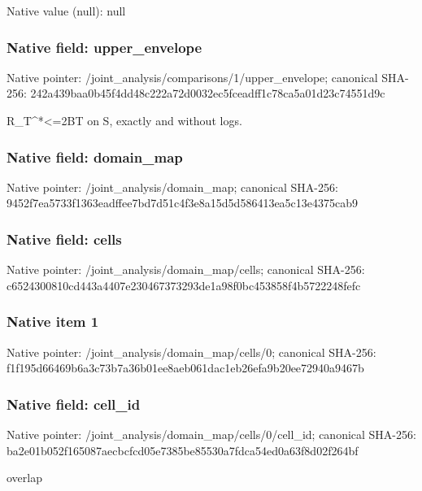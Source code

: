\documentclass[10pt,a4paper]{article}
\begin{document}
Native value (null): null

\subsubsection{Native field: upper\_\allowbreak{}envelope}
Native pointer: /joint\_\allowbreak{}analysis/comparisons/1/upper\_\allowbreak{}envelope; canonical SHA-256: 242a439baa0b45f4dd48c222a72d0032ec5fceadff1c78ca5a01d23c74551d9c

\begingroup\raggedright\sloppy R\_\allowbreak{}T\textasciicircum{}*<=\allowbreak{}2BT on S,\allowbreak{} exactly and without logs.\par\endgroup

\subsubsection{Native field: domain\_\allowbreak{}map}
Native pointer: /joint\_\allowbreak{}analysis/domain\_\allowbreak{}map; canonical SHA-256: 9452f7ea5733f1363eadffee7bd7d51c4f3e8a15d5d586413ea5c13e4375cab9

\subsubsection{Native field: cells}
Native pointer: /joint\_\allowbreak{}analysis/domain\_\allowbreak{}map/cells; canonical SHA-256: c6524300810cd443a4407e230467373293de1a98f0bc453858f4b5722248fefc

\subsubsection{Native item 1}
Native pointer: /joint\_\allowbreak{}analysis/domain\_\allowbreak{}map/cells/0; canonical SHA-256: f1f195d66469b6a3c73b7a36b01ee8aeb061dac1eb26efa9b20ee72940a9467b

\subsubsection{Native field: cell\_\allowbreak{}id}
Native pointer: /joint\_\allowbreak{}analysis/domain\_\allowbreak{}map/cells/0/cell\_\allowbreak{}id; canonical SHA-256: ba2e01b052f165087aecbcfcd05e7385be85530a7fdca54ed0a63f8d02f264bf

\begingroup\raggedright\sloppy overlap\par\endgroup
\end{document}
